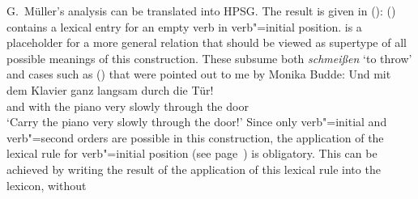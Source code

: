 \begin{exe}
\begin{xlist}[iv.]
\begin{exe}
\begin{xlist}[iv.]
G.\ Müller's analysis can be translated into HPSG. The result is given in ():
\ea
{}
\z
() contains a lexical entry for an empty verb in verb"=initial position. 
is a placeholder for a more general relation that should be viewed as supertype of all possible meanings of this
construction. These subsume both \emph{schmeißen} `to throw' and cases such as () that were pointed out to me by Monika Budde:
\ea
\label{Klavier-durch-die-Tuer}
\gll Und mit dem Klavier ganz langsam durch die Tür!\\
	 and with the piano very slowly through the door\\
\glt `Carry the piano very slowly through the door!'
\z
Since only verb"=initial and verb"=second orders are possible in this construction, the application of the lexical rule for verb"=initial position
(see page~\pageref{lr-verb-movement}) is obligatory. This can be achieved by writing the result of the application of this lexical rule into the lexicon, without

\end{xlist}
\end{exe}
\end{xlist}
\end{exe}
